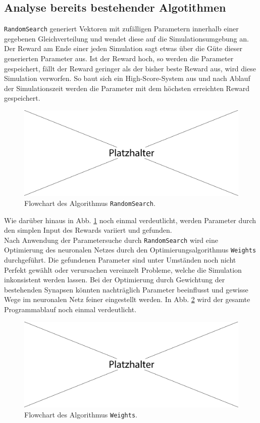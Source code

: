 	\subsection{Analyse bereits bestehender Algotithmen}
		\texttt{RandomSearch} generiert Vektoren mit zufälligen Parametern innerhalb einer gegebenen Gleichverteilung und wendet diese auf die Simulationsumgebung an. Der Reward am Ende einer jeden Simulation sagt etwas über die Güte dieser generierten Parameter aus. Ist der Reward hoch, so werden die Parameter gespeichert, fällt der Reward geringer als der bisher beste Reward aus, wird diese Simulation verworfen. So baut sich ein High-Score-System aus und nach Ablauf der Simulationszeit werden die Parameter mit dem höchsten erreichten Reward gespeichert.
		\begin{figure}[!h] %
			\centering
			\includegraphics[width=12cm]{figures/sonstiges/platzhalter.pdf}
			\caption{Flowchart des Algorithmus \texttt{RandomSearch}.}
			\label{fig:erg_rs_flow}
		\end{figure}
		Wie darüber hinaus in Abb. \ref{fig:erg_rs_flow} noch einmal verdeutlicht, werden Parameter durch den simplen Input des Rewards variiert und gefunden.\\
		Nach Anwendung der Parametersuche durch \texttt{RandomSearch} wird eine Optimierung des neuronalen Netzes durch den Optimierungsalgorithmus \texttt{Weights} durchgeführt. Die gefundenen Parameter sind unter Umständen noch nicht Perfekt gewählt oder verursachen vereinzelt Probleme, welche die Simulation inkonsistent werden lassen. Bei der Optimierung durch Gewichtung der bestehenden Synapsen könnten nachträglich Parameter beeinflusst und gewisse Wege im neuronalen Netz feiner eingestellt werden. In Abb. \ref{fig:erg_w_flow} wird der gesamte Programmablauf noch einmal verdeutlicht.
		\begin{figure}[!h] %
			\centering
			\includegraphics[width=12cm]{figures/sonstiges/platzhalter.pdf}
			\caption{Flowchart des Algorithmus \texttt{Weights}.}
			\label{fig:erg_w_flow}
		\end{figure}
